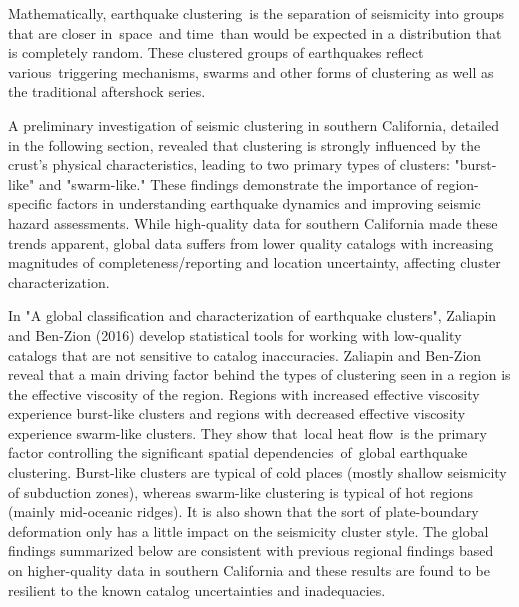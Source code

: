 \documentclass[12pt]{article} %
\theoremstyle{plain}
\begin{document}
	Mathematically, earthquake clustering is the separation of seismicity into groups that are closer in space and time than would be expected in a distribution that is completely random. These clustered groups of earthquakes reflect various triggering mechanisms, swarms and other forms of clustering as well as the traditional aftershock series. 
	
	A preliminary investigation of seismic clustering in southern California, detailed in the following section, revealed that clustering is strongly influenced by the crust's physical characteristics, leading to two primary types of clusters: "burst-like" and "swarm-like." These findings demonstrate the importance of region-specific factors in understanding earthquake dynamics and improving seismic hazard assessments. While high-quality data for southern California made these trends apparent, global data suffers from lower quality catalogs with increasing magnitudes of completeness/reporting and location uncertainty, affecting cluster characterization.
	
	In "A global classification and characterization of earthquake clusters", Zaliapin and Ben-Zion (2016) develop statistical tools for working with low-quality catalogs that are not sensitive to catalog inaccuracies. Zaliapin and Ben-Zion reveal that a main driving factor behind the types of clustering seen in a region is the effective viscosity of the region. Regions with increased effective viscosity experience burst-like clusters and regions with decreased effective viscosity experience swarm-like clusters. They show that local heat flow is the primary factor controlling the significant spatial dependencies of global earthquake clustering. 
	Burst-like clusters are typical of cold places (mostly shallow seismicity of subduction zones), whereas swarm-like clustering is typical of hot regions (mainly mid-oceanic ridges). It is also shown that the sort of plate-boundary deformation only has a little impact on the seismicity cluster style. The global findings summarized below are consistent with previous regional findings based on higher-quality data in southern California and these results are found to be resilient to the known catalog uncertainties and inadequacies.
	
	
	
\end{document}
